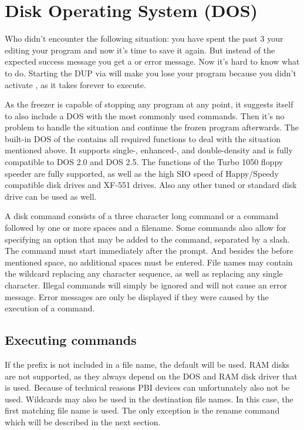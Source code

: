 \section{Disk Operating System (DOS)}
Who didn't encounter the following situation: you have spent the past 3 your
editing your program and now it's time to save it again. But instead of the
expected success message you get a  or  error
message. Now it's hard to know what to do. Starting the DUP via  will
make you lose your program because you didn't activate , as it takes
forever to execute.

As the freezer is capable of stopping any program at any point, it suggests
itself to also include a DOS with the most commonly used commands.
Then it's no problem to handle the situation and continue the frozen
program afterwards.
The built-in DOS of the \frz contains all required functions to deal with the
situation mentioned above. It supports single-, enhanced-, and double-density
and is fully compatible to DOS 2.0 and DOS 2.5. The functions of the Turbo 1050
floppy speeder are fully supported, as well as the high SIO speed of
Happy/Speedy compatible disk drives and XF-551 drives. Also any other tuned or
standard disk drive can be used as well.

A disk command consists of  a three character long command or a command followed
by one or more spaces and a filename. Some commands also allow for specifying an
option that may be added to the command, separated by a slash. The command must
start immediately after the prompt. And besides the before mentioned space, no
additional spaces must be entered. File names may contain the wildcard \fq{\fmsg{*}}
replacing any character sequence, as well as  replacing any single
character.
Illegal commands will simply be ignored and will not cause an error message.
Error messages are only be displayed if they were caused by the execution of
a command.

\subsection{Executing commands}
If the prefix  is not included in a file name, the default 
 will be used. RAM disks are not supported, as they always
depend on the DOS and RAM disk driver that is used. Because of technical
reasons PBI devices can unfortunately also not be used.
Wildcards may also be used in the destination file names. In this case, the
first matching file name is used. The only exception is the rename command
 which will be described in the next section.

